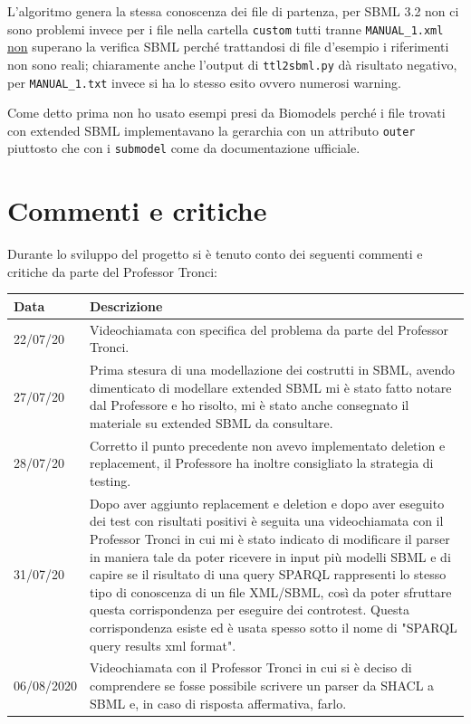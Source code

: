 \documentclass{article}
\begin{document}
L'algoritmo genera la stessa conoscenza dei file di partenza, per SBML 3.2 non ci sono problemi invece per i file nella cartella \texttt{custom} tutti tranne \texttt{MANUAL\_1.xml} \underline{non} superano la verifica SBML perché trattandosi di file d'esempio i riferimenti non sono reali; chiaramente anche l'output di \texttt{ttl2sbml.py} dà risultato negativo, per \texttt{MANUAL\_1.txt} invece si ha lo stesso esito ovvero numerosi warning.

Come detto prima non ho usato esempi presi da Biomodels perché i file trovati con extended SBML implementavano la gerarchia con un attributo \texttt{outer} piuttosto che con i \texttt{submodel} come da documentazione ufficiale.

\section{Commenti e critiche}
Durante lo sviluppo del progetto si è tenuto conto dei seguenti commenti e critiche da parte del Professor Tronci:

\begin{longtable}{p{2cm}p{9cm}}
    \textbf{Data} & \textbf{Descrizione} \\
    \hline
    22/07/20 & Videochiamata con specifica del problema da parte del Professor Tronci. \\
    \hline
    27/07/20 & Prima stesura di una modellazione dei costrutti in SBML, avendo dimenticato di modellare extended SBML mi è stato fatto notare dal Professore e ho risolto, mi è stato anche consegnato il materiale su extended SBML da consultare. \\
    \hline
    28/07/20 & Corretto il punto precedente non avevo implementato deletion e replacement, il Professore ha inoltre consigliato la strategia di testing. \\
    \hline
    31/07/20 & Dopo aver aggiunto replacement e deletion e dopo aver eseguito dei test con risultati positivi è seguita una videochiamata con il Professor Tronci in cui mi è stato indicato di modificare il parser in maniera tale da poter ricevere in input più modelli SBML e di capire se il risultato di una query SPARQL rappresenti lo stesso tipo di conoscenza di un file XML/SBML, così da poter sfruttare questa corrispondenza per eseguire dei controtest. Questa corrispondenza esiste ed è usata spesso sotto il nome di "SPARQL query results xml format". \\
    \hline
    06/08/2020 & Videochiamata con il Professor Tronci in cui si è deciso di comprendere se fosse possibile scrivere un parser da SHACL a SBML e, in caso di risposta affermativa, farlo. \\
    \hline
\end{longtable}
\end{document}
